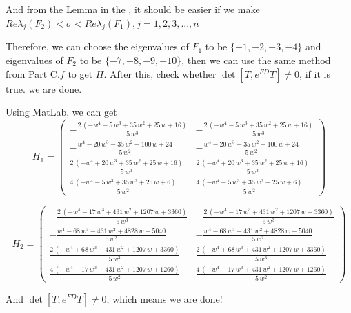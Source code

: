 \documentclass{article}
\begin{document}
And from the Lemma in the \cite{engel2002continuous}, it should be easier if we make $Re \lambda_j (F_2) < \sigma < Re \lambda_j (F_1), j = 1,2,3,...,n$

Therefore, we can choose the eigenvalues of $F_1$ to be $\{-1,-2,-3,-4\}$ and eigenvalues of $F_2$ to be $\{-7,-8,-9,-10\}$, then we can use the same method from Part C.$f$ to get $H$. After this, check whether $\det [T, e^{FD}T] \neq 0$, if it is true. we are done.

Using MatLab, we can get 
$$H_1 = \left(\begin{array}{cc} -\frac{2\,\left(-w^4-5\,w^3+35\,w^2+25\,w+16\right)}{5\,w^3} & -\frac{2\,\left(-w^4-5\,w^3+35\,w^2+25\,w+16\right)}{5\,w^3}\\ -\frac{w^4-20\,w^3-35\,w^2+100\,w+24}{5\,w^2} & -\frac{w^4-20\,w^3-35\,w^2+100\,w+24}{5\,w^2}\\ \frac{2\,\left(-w^4+20\,w^3+35\,w^2+25\,w+16\right)}{5\,w^3} & \frac{2\,\left(-w^4+20\,w^3+35\,w^2+25\,w+16\right)}{5\,w^3}\\ \frac{4\,\left(-w^4-5\,w^3+35\,w^2+25\,w+6\right)}{5\,w^2} & \frac{4\,\left(-w^4-5\,w^3+35\,w^2+25\,w+6\right)}{5\,w^2} \end{array}\right)$$

$$H_2 = \left(\begin{array}{cc} -\frac{2\,\left(-w^4-17\,w^3+431\,w^2+1207\,w+3360\right)}{5\,w^3} & -\frac{2\,\left(-w^4-17\,w^3+431\,w^2+1207\,w+3360\right)}{5\,w^3}\\ -\frac{w^4-68\,w^3-431\,w^2+4828\,w+5040}{5\,w^2} & -\frac{w^4-68\,w^3-431\,w^2+4828\,w+5040}{5\,w^2}\\ \frac{2\,\left(-w^4+68\,w^3+431\,w^2+1207\,w+3360\right)}{5\,w^3} & \frac{2\,\left(-w^4+68\,w^3+431\,w^2+1207\,w+3360\right)}{5\,w^3}\\ \frac{4\,\left(-w^4-17\,w^3+431\,w^2+1207\,w+1260\right)}{5\,w^2} & \frac{4\,\left(-w^4-17\,w^3+431\,w^2+1207\,w+1260\right)}{5\,w^2} \end{array}\right)$$

And $\det [T, e^{FD}T] \neq 0$, which means we are done!




\newpage
\end{document}
